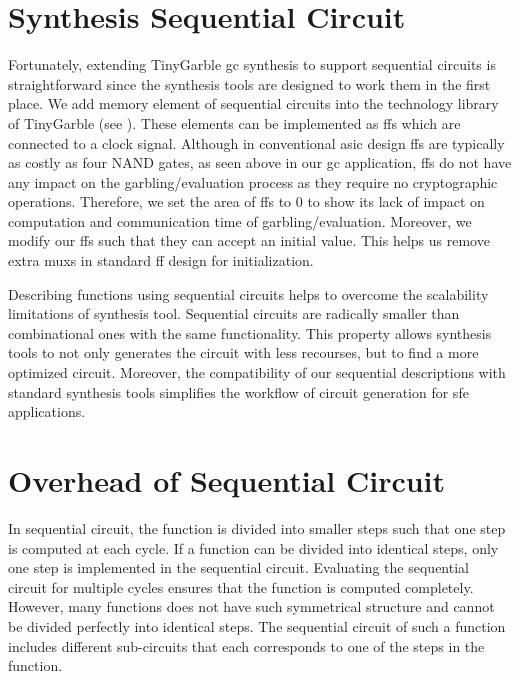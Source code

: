 \section{Synthesis Sequential Circuit}\label{sec:seq-syn}
Fortunately, extending TinyGarble \acrshort{gc} synthesis to support sequential circuits is straightforward since the synthesis tools are designed to work them in the first place.
We add memory element of sequential circuits into the technology library of TinyGarble (see ).
These elements can be implemented as \acrshort{ff}s which are connected to a clock signal.
Although in conventional \acrshort{asic} design \acrshort{ff}s are typically as costly as four NAND gates, as seen above in our \acrshort{gc} application, \acrshort{ff}s do not have any impact on the garbling/evaluation process as they require no cryptographic operations.
Therefore, we set the area of \acrshort{ff}s to 0 to show its lack of impact on computation and communication time of garbling/evaluation.
Moreover, we modify our \acrshort{ff}s such that they can accept an initial value.
This helps us remove extra \acrshort{mux}s in standard \acrshort{ff} design for initialization.

Describing functions using sequential circuits helps to overcome the scalability limitations of synthesis tool.
Sequential circuits are radically smaller than combinational ones with the same functionality.
This property allows synthesis tools to not only generates the circuit with less recourses, but to find a more optimized circuit.
Moreover, the compatibility of our sequential descriptions with standard synthesis tools simplifies the workflow of circuit generation for \acrshort{sfe} applications.

\section{Overhead of Sequential Circuit}\label{sec:seq-overhead}
In sequential circuit, the function is divided into smaller steps such that one step is computed at each cycle.
If a function can be divided into identical steps, only one step is implemented in the sequential circuit.
Evaluating the sequential circuit for multiple cycles ensures that the function is computed completely.
However, many functions does not have such symmetrical structure and cannot be divided perfectly into identical steps.
The sequential circuit of such a function includes different sub-circuits that each corresponds to one of the steps in the function.

